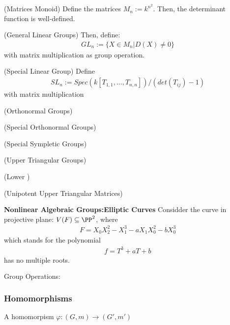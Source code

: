 \documentclass[Total.tex]{subfiles}
\begin{document}
			\begin{example}
				(Matrices Monoid) Define the matrices $M_n:=k^{n^2}$. Then, the determinant function is well-defined.
			\begin{example}
				(General Linear Groups) Then, define:
				\begin{gather*}
					GL_n:=\{X\in M_n|D(X)\not=0\}
				\end{gather*}
				with matrix multiplication as group operation.
			\end{example}
			\begin{example}
				(Special Linear Group) Define
				\begin{gather*}
					SL_n:=Spec(k[T_{1,1},\dots,T_{n,n}])/(det(T_{ij})-1)
				\end{gather*}
				with matrix multiplication
			\end{example}
			\begin{example}
				(Orthonormal Groups)
			\end{example}
			\begin{example}
				(Special Orthonormal Groups)
			\end{example}
			\begin{example}
				(Special Sympletic Groups)
			\end{example}
			\begin{example}
				(Upper Triangular Groups)
			\end{example}
			\begin{example}
				(Lower )
			\end{example}
			\begin{example}
				(Unipotent Upper Triangular Matrices)
			\end{example}
			\begin{example}
				\textbf{Nonlinear Algebraic Groups:Elliptic Curves} Considder the curve in projective plane: $V(F)\subseteq \PP^2$, where
				\begin{gather*}
					F=X_0X_2^2-X_1^3-aX_1X_0^2-bX_0^3
				\end{gather*}
				which stands for the polynomial
				\begin{gather*}
					f=T^3+aT+b
				\end{gather*}
				has no multiple roots.
				
				Group Operations:
			\end{example}
			\subsubsection{Homomorphisms}
				\begin{Def}
				 A homomorpism $\varphi:(G,m)\rightarrow (G',m')$
				\end{Def}

\end{example}
\end{document}
